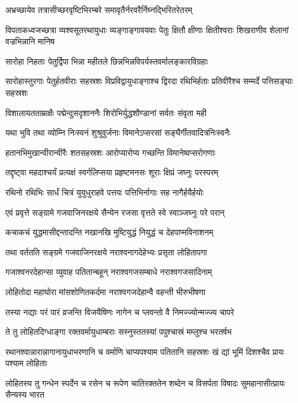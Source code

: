 \twolineshloka
{अभ्रच्छायेव तत्रासीच्छरवृष्टिभिरम्बरे}
{समावृतैर्नरवरैर्निघ्नद्भिरितरेतरम्}


\threelineshloka
{विपताकध्वजच्छत्रा व्यश्वसूतरथायुधाः}
{व्यङ्गाङ्गावयवाः पेतुः क्षितौ क्षीणाः क्षितीश्वराः}
{शिखराणीव शेलानां वज्रभिन्नानि मानिष}


\twolineshloka
{सारोहा निहताः पेतुर्द्विपा भिन्ना महीतले}
{छिन्नभिन्नविपर्यस्तवर्मालङ्कारविग्रहाः}


\threelineshloka
{सारोहास्तुरगाः पेतुर्हतवीराः सहस्रशः}
{विप्रविद्वायुधाङ्गाश्च द्विरदा रथिभिर्हताः}
{प्रतिवीरैश्च सम्मर्दे पत्तिसङ्घाः सहस्रशः}


\twolineshloka
{विशालायतताम्राक्षैः पद्मेन्दुसदृशाननैः}
{शिरोभिर्युद्धशौण्डानां सर्वतः संवृता मही}


\twolineshloka
{यथा भुवि तथा व्योम्नि निःस्वनं शुश्रुवुर्जनाः}
{विमानेऽप्सरसां सङ्घैर्गीतवादित्रनिःस्वनैः}


\twolineshloka
{हतानभिमुखान्वीरान्वीरैः शतसहस्रशः}
{आरोप्यारोप्य गच्छन्ति विमानेष्वप्सरोगणाः}


\twolineshloka
{तद्दृष्ट्वा महदाश्चर्यं प्रत्यक्षं स्वर्गलिप्सया}
{प्रहृष्टमनसः शूराः क्षिप्रं जघ्नुः परस्परम्}


\twolineshloka
{रथिनो रथिभिः सार्धं चित्रं युयुधुराहवे}
{पत्तयः पत्तिभिर्नागाः सह नागैर्हयैर्हयोः}


\twolineshloka
{एवं प्रवृत्ते सङ्ग्रामे गजवाजिनरक्षये}
{सैन्येन रजसा वृत्तते स्वे स्वाञ्जघ्नुः परे परान्}


\twolineshloka
{कचाकचं युद्धमासीद्दन्तादन्ति नखानखि}
{मुष्टियुद्धं नियुद्धं च देहपाप्मविनाशनम्}


\twolineshloka
{तथा वर्ततति सङ्ग्रमे गजवाजिनरक्षये}
{नराश्वनागदेहेभ्यः प्रसृता लोहितापगा}


\twolineshloka
{गजाश्वनरदेहान्सा व्युवाह पतितान्बहून्}
{नराश्वगजसम्बाधे नराश्वगजसादिनाम्}


\twolineshloka
{लोहितोदा महाघोरा मांसशोणितकर्दमा}
{नराश्वगजदेहान्वै वहन्ती भीरुभीषणा}


\twolineshloka
{तस्या नद्याः परं पारं व्रजन्ति विजयैषिणः}
{नागेन च प्लवन्तो वै निमज्ज्योन्मज्ज्य चापरे}


\twolineshloka
{ते तु लोहितदिग्धाङ्गा रक्तवर्मायुधाम्बराः}
{सस्नुस्ततस्यां पपुश्चास्रं मम्लुश्च भरतर्षभ}


\threelineshloka
{रथानश्वान्नारान्नागानायुधाभरणानि च}
{वर्माणि चाप्यपश्याम पतितानि सहस्रशः}
{खं द्यां भूमिं दिशश्चैव प्रायः पश्याम लोहिताः}


\threelineshloka
{लोहितस्य तु गन्धेन स्पर्देन च रसेन च}
{रूपेण चातिरक्ततेन शब्देन च विसर्पता}
{विषादः सुमहानासीत्प्रायः सैन्यस्य भारत}


